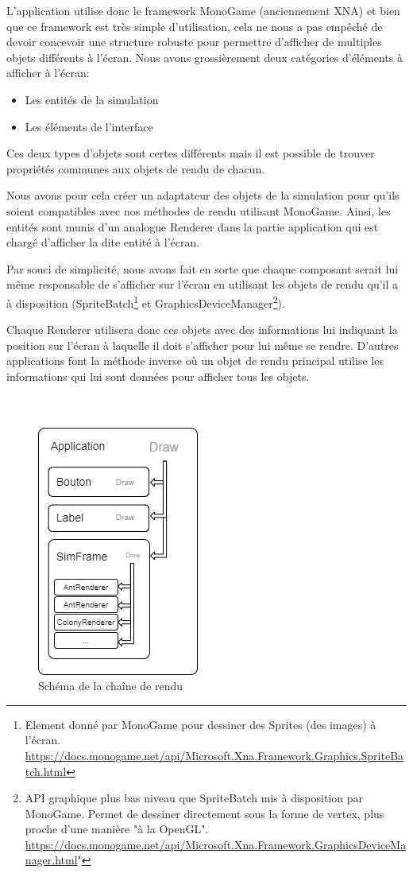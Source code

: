 \documentclass{EPUProjetDi}
\begin{document}
L'application utilise donc le framework MonoGame (anciennement XNA) et bien que ce framework est très simple d'utilisation, cela ne nous a 
pas empêché de devoir concevoir une structure robuste pour permettre d'afficher de multiples objets différents à l'écran.
Nous avons grossièrement deux catégories d'éléments à afficher à l'écran:
\begin{itemize}
    \item Les entités de la simulation
    \item Les éléments de l'interface
\end{itemize}

Ces deux types d'objets sont certes différents mais il est possible de trouver propriétés communes aux objets de rendu de chacun.

Nous avons pour cela créer un adaptateur des objets de la simulation pour qu'ils soient compatibles avec nos méthodes de rendu 
utilisant MonoGame. Ainsi, les entités sont munis d'un analogue Renderer dans la partie application qui est chargé d'afficher la dite 
entité à l'écran.

Par souci de simplicité, nous avons fait en sorte que chaque composant serait lui même responsable de s'afficher sur l'écran en utilisant les
objets de rendu qu'il a à disposition (SpriteBatch\footnote{Element donné par MonoGame pour dessiner des Sprites (des images) à l'écran. 
\url{https://docs.monogame.net/api/Microsoft.Xna.Framework.Graphics.SpriteBatch.html}} et GraphicsDeviceManager\footnote{API graphique plus
bas niveau que SpriteBatch mis à disposition par MonoGame. Permet de dessiner directement sous la forme de vertex, plus proche d'une manière "à la 
OpenGL". \url{https://docs.monogame.net/api/Microsoft.Xna.Framework.GraphicsDeviceManager.html}"}).

Chaque Renderer utilisera donc ces objets avec des informations lui indiquant la position sur l'écran à laquelle il doit s'afficher pour
lui même se rendre. D'autres applications font la méthode inverse où un objet de rendu principal utilise les informations qui lui sont 
données pour afficher tous les objets.

\begin{figure}[h]
    \centering
    \includegraphics[scale=0.8]{application_draw.png}
    \caption{Schéma de la chaîne de rendu}
    \label{fig:draw_chain}
\end{figure}
\end{document}
